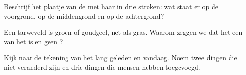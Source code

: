 \begin{exercise}[$\star\star$]\label{exo:g1:landscapes-around-us:9}
Beschrijf het plaatje van de  met haar  in drie stroken: wat
staat er op de voorgrond, op de middengrond en op de achtergrond?
\end{exercise}

\begin{exercise}[$\star\star$]\label{exo:g1:landscapes-around-us:10}
Een tarweveld is groen of goudgeel, net als gras. Waarom zeggen we dat het
een  van het  is en geen ?
\end{exercise}

\begin{exercise}[$\star\star$]\label{exo:g1:landscapes-around-us:11}
Kijk naar de tekening van het  lang geleden en vandaag. Noem twee
dingen die niet veranderd zijn en drie dingen die mensen hebben toegevoegd.
\end{exercise}
